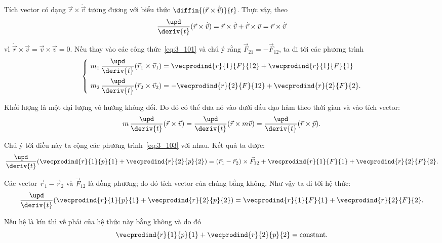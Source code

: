 Tích vector có dạng $\vec{r}\times\dot{\vec{v}}$ tương đương với biểu thức $\diffin{(\vec{r}\times\dot{\vec{v}})}{t}$. Thực vậy, theo 
\begin{equation}\label{eq:3_102}
\frac{\upd}{\deriv{t}}(\vec{r}\times\dot{\vec{v}}) = \vec{r}\times\dot{\vec{v}} + \dot{\vec{r}}\times\vec{v} = \vec{r}\times\dot{\vec{v}}
\end{equation}

\noindent
vì $\dot{\vec{r}}\times\vec{v}=\vec{v}\times\vec{v}=0$. Nếu thay vào các công thức~\eqref{eq:3_101} và chú ý rằng $\vec{F}_{21}=-\vec{F}_{12}$, ta đi tới các phương trình
\begin{equation}\label{eq:3_103}
\begin{cases}
& \!\!\!\! m_1\,\dfrac{\upd}{\deriv{t}}(\vec{r}_1\times\vec{v}_1) = \vecprodind{r}{1}{F}{12} + \vecprodind{r}{1}{F}{1}\\[10pt]
& \!\!\!\! m_2\,\dfrac{\upd}{\deriv{t}}(\vec{r}_2\times\vec{v}_2) = - \vecprodind{r}{2}{F}{12} + \vecprodind{r}{2}{F}{2}.
\end{cases}
\end{equation}

Khối lượng là một đại lượng vô hướng không đổi. Do đó có thể đưa nó vào dưới dấu đạo hàm theo thời gian và vào tích vector: 
\begin{equation*}
m\,\frac{\upd}{\deriv{t}}(\vec{r}\times\vec{v}) = \frac{\upd}{\deriv{t}}(\vec{r}\times m\vec{v}) = \frac{\upd}{\deriv{t}}(\vec{r}\times\vec{p}).
\end{equation*}

\noindent
Chú ý tới điều này ta cộng các phương trình~\eqref{eq:3_103} với nhau. Kết quả ta được: \begin{equation*}
\frac{\upd}{\deriv{t}}(\vecprodind{r}{1}{p}{1} + \vecprodind{r}{2}{p}{2}) = (\vec{r}_1-\vec{r}_2)\times\vec{F}_{12} + \vecprodind{r}{1}{F}{1} + \vecprodind{r}{2}{F}{2}.
\end{equation*}

\noindent
Các vector $\vec{r}_1-\vec{r}_2$ và $\vec{F}_{12}$ là đồng phương; do đó tích vector của chúng bằng không. Như vậy ta đi tới hệ thức:
\begin{equation}\label{eq:3_104}
\frac{\upd}{\deriv{t}}(\vecprodind{r}{1}{p}{1} + \vecprodind{r}{2}{p}{2}) = \vecprodind{r}{1}{F}{1} + \vecprodind{r}{2}{F}{2}.
\end{equation}

\noindent
Nếu hệ là kín thì vế phải của hệ thức này bằng không và do đó 
\begin{equation*}
\vecprodind{r}{1}{p}{1} + \vecprodind{r}{2}{p}{2} = \text{constant}.
\end{equation*}

